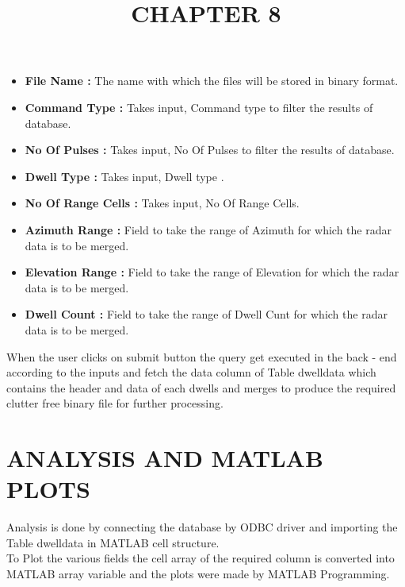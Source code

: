 \documentclass[14pt]{article} %
\begin{document}
  \begin{itemize} 
  \item[] \textbf{File Name : } The name with which the files will be stored in binary format.
  \item[] \textbf{Command Type : }Takes input, Command type to filter the results of database. 
  \item[] \textbf{No Of Pulses : }Takes input, No Of Pulses to filter the results of database. 
  \item[] \textbf{Dwell Type : }Takes input, Dwell type .   
  \item[] \textbf{No Of Range Cells : }Takes input, No Of Range Cells.
  \item[] \textbf{Azimuth Range : }Field to take the range of Azimuth for which the radar data is to be merged.
  \item[] \textbf{Elevation Range : }Field to take the range of Elevation for which the radar data is to be merged.
  \item[] \textbf{Dwell Count : }Field to take the range of Dwell Cunt for which the radar data is to be merged.
  \end{itemize}
  When the user clicks on submit button the query get executed in the back - end according to the inputs and fetch the data column of Table dwelldata which contains the header and data of each dwells and merges to produce the required clutter free binary file for further processing.
 
  \title{\textbf{\huge {CHAPTER 8}}}
\maketitle
\section{ANALYSIS AND MATLAB PLOTS}
\noindent Analysis is done by connecting the database by ODBC driver and importing the Table dwelldata in MATLAB cell structure.
\\
To Plot the various fields the cell array of the required column is converted into MATLAB array variable and the plots were made by MATLAB Programming.
\end{document}
